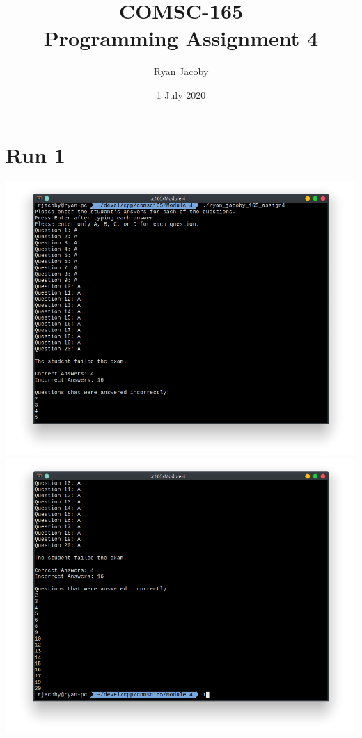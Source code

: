 \documentclass[letterpaper, 11pt]{article}
\title{COMSC-165 \\ Programming Assignment 4}
\author{Ryan Jacoby}
\date{1 July 2020}
\begin{document}
\maketitle

\section*{Run 1}
\includegraphics[scale=0.5]{run1_1.png} \\
\includegraphics[scale=0.5]{run1_2.png}
\end{document}
